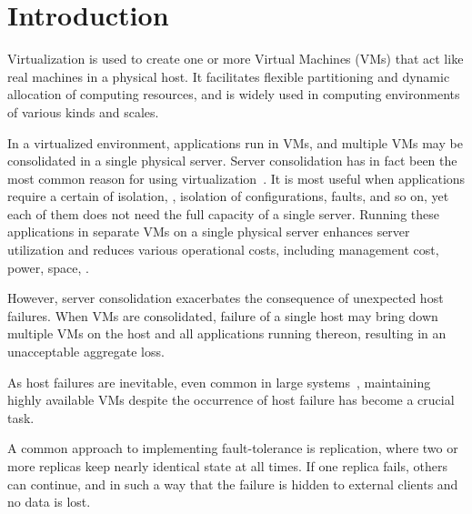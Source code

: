 \section{Introduction} \label{sec:intro}


Virtualization is used to create one or more Virtual Machines (VMs) that act like real machines 
in a physical host. It facilitates flexible partitioning and dynamic allocation of computing 
resources, and is widely used in computing environments of various kinds and scales.

In a virtualized environment, applications run in VMs, and multiple VMs may be consolidated 
in a single physical server. Server consolidation has in fact been the most common reason for 
using virtualization~\cite{mcdougall2010virtualization}. It is most useful when applications 
require a certain of isolation, \eg, isolation of configurations, faults, and so on, yet each 
of them does not need the full capacity of a single server. Running these applications in 
separate VMs on a single physical server enhances server utilization and reduces various 
operational costs, including management cost, power, space, \etc.


However, server consolidation exacerbates the consequence of unexpected host failures.
When VMs are consolidated, failure of a single host may bring down multiple VMs on the host 
and all applications running thereon, resulting in an unacceptable aggregate loss.

As host failures are inevitable, even common in large systems~\cite{vishwanath2010characterizing,
barroso2013datacenter}, maintaining highly available VMs despite the occurrence of host failure 
has become a crucial task.

A common approach to implementing fault-tolerance is replication, where two or more replicas 
keep nearly identical state at all times. If one replica fails, others can continue, and in 
such a way that the failure is hidden to external clients and no data is lost.


